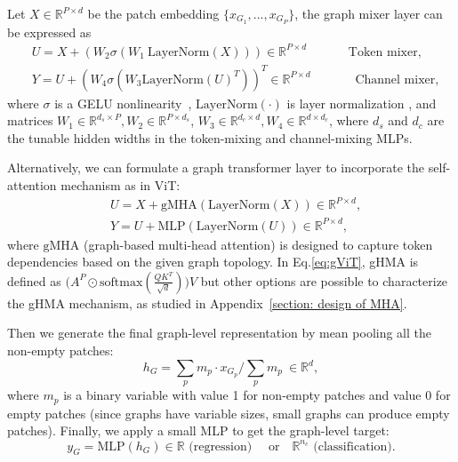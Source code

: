 \documentclass{article}
\begin{document}
Let $X\in \mathbb{R}^{P\times d}$ be the patch embedding $\{x_{G_1},..., x_{G_P}\}$, the graph mixer layer can be expressed as 
\begin{equation}
    \begin{split}
        &U  = X + (W_2\sigma(W_1\ \textrm{LayerNorm}(X))) \in \mathbb{R}^{P\times d}
         \quad\quad\quad \textrm { Token mixer},\\
    &Y = U + (W_4\sigma(W_3 \textrm{LayerNorm}(U)^T))^T \in \mathbb{R}^{P\times d}
     \quad\quad\quad\ \textrm { Channel mixer},
    \end{split}
\end{equation}
where $\sigma$ is a GELU nonlinearity~\citep{hendrycks2016gaussian}, $\textrm{LayerNorm}(\cdot)$ is layer normalization  \citep{ba2016layer}, and matrices $W_1 \in \mathbb{R}^{d_s \times P}, W_2\in \mathbb{R}^{P \times d_s}$, $W_3\in \mathbb{R}^{d_c \times d}, W_4\in \mathbb{R}^{d\times d_c}$, where $d_s$ and $d_c$ are the tunable hidden widths in the token-mixing and channel-mixing MLPs.

Alternatively, we can formulate a graph transformer layer to incorporate the self-attention mechanism as in ViT:
\begin{equation}
\label{eq:gViT}
    \begin{split}
        &U  = X + \textrm{gMHA}(\textrm{LayerNorm}(X)) \in \mathbb{R}^{P\times d}, \\
    &Y = U + \textrm{MLP}(\textrm{LayerNorm}(U)) \in \mathbb{R}^{P\times d},
    \end{split}
\end{equation}
where $\textrm{gMHA}$ (graph-based multi-head attention) is designed to capture token dependencies based on the given graph topology. In Eq.\eqref{eq:gViT}, gHMA is defined as $\big(A^P\odot\textrm{softmax}(\frac{QK^T}{\sqrt{d}})\big)V$ but other options are possible to characterize the gHMA mechanism, as studied in Appendix~\ref{section: design of MHA}. 


Then we generate the final graph-level representation by mean pooling all the non-empty patches:
\begin{equation}
    h_G = \sum_{p} m_p \cdot x_{G_p} / \sum_{p} m_p \  \in\mathbb{R}^{d},
\end{equation}
where $m_p$ is a binary variable with value 1 for non-empty patches and value 0 for empty patches (since graphs have variable sizes, small graphs can produce empty patches). 
Finally, we apply a small MLP to get the graph-level target:
\begin{equation}
y_{G} = \textrm{MLP}(h_G) \in \mathbb{R} \textrm{ (regression) } \quad \textrm{or} \quad \mathbb{R}^{n_c} \textrm{ (classification)}. 
\end{equation}
\end{document}
